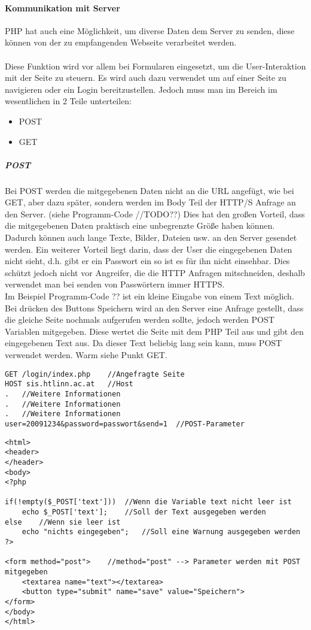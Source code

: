 \paragraph{Kommunikation mit Server}
PHP hat auch eine Möglichkeit, um diverse Daten dem Server zu 
senden, diese können von der zu empfangenden Webseite verarbeitet werden.\\\\
Diese Funktion wird vor allem bei Formularen eingesetzt, um die User-Interaktion mit der Seite zu steuern. Es wird auch dazu verwendet um auf einer Seite zu navigieren oder ein Login bereitzustellen. Jedoch muss man im Bereich im wesentlichen in 2 Teile unterteilen:
\begin{itemize}
    \item POST
    \item GET
\end{itemize}
\subparagraph{POST}
Bei POST werden die mitgegebenen Daten nicht an die URL angefügt, wie bei GET, aber dazu später, sondern werden im Body Teil der HTTP/S Anfrage an den Server. (siehe Programm-Code //TODO??) Dies hat den großen Vorteil, dass die mitgegebenen Daten praktisch eine unbegrenzte Größe haben können. Dadurch können auch lange Texte, Bilder, Dateien usw. an den Server gesendet werden. Ein weiterer Vorteil liegt darin, dass der User die eingegebenen Daten nicht sieht, d.h. gibt er ein Passwort ein so ist es für ihn nicht einsehbar. Dies schützt jedoch nicht vor Angreifer, die die HTTP Anfragen mitschneiden, deshalb verwendet man bei senden von Passwörtern immer HTTPS.\\
Im Beispiel Programm-Code ?? ist ein kleine Eingabe von einem Text möglich. Bei drücken des Buttons Speichern wird an den Server eine Anfrage gestellt, dass die gleiche Seite nochmals aufgerufen werden sollte, jedoch werden POST Variablen mitgegeben. Diese wertet die Seite mit dem PHP Teil aus und gibt den eingegebenen Text aus. Da dieser Text beliebig lang sein kann, muss POST verwendet werden. Warm siehe Punkt GET.
\begin{lstlisting}[style=CustomPHP, caption={Ausschnitt HTTP-Body}]
GET /login/index.php	//Angefragte Seite
HOST sis.htlinn.ac.at	//Host
.	//Weitere Informationen
.	//Weitere Informationen
.	//Weitere Informationen
user=20091234&password=passwort&send=1	//POST-Parameter
\end{lstlisting}
\begin{lstlisting}[style=CustomPHP, caption={Beispiel POST}]
<html>
<header>
</header>
<body>
<?php

if(!empty($_POST['text']))	//Wenn die Variable text nicht leer ist
	echo $_POST['text'];	//Soll der Text ausgegeben werden
else	//Wenn sie leer ist
	echo "nichts eingegeben";	//Soll eine Warnung ausgegeben werden
?>

<form method="post">	//method="post" --> Parameter werden mit POST mitgegeben
	<textarea name="text"></textarea>
	<button type="submit" name="save" value="Speichern">
</form>
</body>
</html>
\end{lstlisting}
